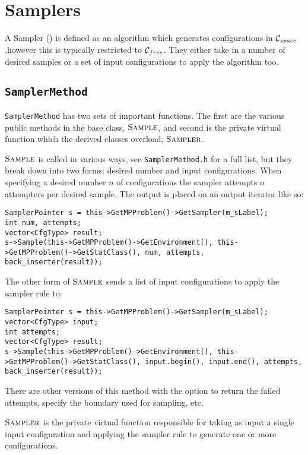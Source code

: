\chapter{Samplers}

A Sampler (\samp) is defined as an algorithm which generates configurations in
$\mathcal{C}_{space}$,however this is typically restricted to $\mathcal{C}_{free}$. They either take in
a number of desired samples or a set of input configurations to apply the
algorithm too.

\section{\texttt{SamplerMethod}}

\texttt{SamplerMethod} has two sets of important functions. The first are the
various public methods in the base class, $\textsc{Sample}$, and second is the
private virtual function which the derived classes overload, $\textsc{Sampler}$.

$\textsc{Sample}$ is called in various ways, see \texttt{SamplerMethod.h} for a
full list, but they break down into two forms: desired number and input
configurations. When specifying a desired number $n$ of configurations the
sampler attempts $a$ attempters per desired sample. The output is placed on an
output iterator like so:
\begin{lstlisting}
SamplerPointer s = this->GetMPProblem()->GetSampler(m_sLabel);
int num, attempts;
vector<CfgType> result;
s->Sample(this->GetMPProblem()->GetEnvironment(), this->GetMPProblem()->GetStatClass(), num, attempts, back_inserter(result));
\end{lstlisting}
The other form of $\textsc{Sample}$ sends a list of input configurations to apply
the sampler rule to:
\begin{lstlisting}
SamplerPointer s = this->GetMPProblem()->GetSampler(m_sLabel);
vector<CfgType> input;
int attempts;
vector<CfgType> result;
s->Sample(this->GetMPProblem()->GetEnvironment(), this->GetMPProblem()->GetStatClass(), input.begin(), input.end(), attempts, back_inserter(result));
\end{lstlisting}
There are other versions of this method with the option to return the failed
attempts, specify the boundary used for sampling, etc.

$\textsc{Sampler}$ is the private virtual function responsible for taking as input
a single input configuration and applying the sampler rule to generate one or
more configurations.


